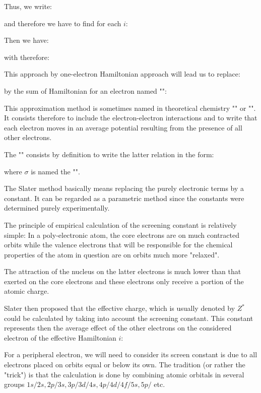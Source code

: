	Thus, we write:
	
	and therefore we have to find for each $i$:
	
	Then we have:
	
	with therefore:
	
	This approach by one-electron Hamiltonian approach will lead us to replace:
	
	by the sum of Hamiltonian for an electron named "":
	
	This approximation method is sometimes named in theoretical chemistry "" or "". It consists therefore to include the electron-electron interactions and to write that each electron moves in an average potential resulting from the presence of all other electrons.
	
	The "" consists by definition to write the latter relation in the form:
	
	where $\sigma$ is named the "".
	
	The Slater method basically means replacing the purely electronic terms by a constant. It can be regarded as a parametric method since the constants were determined purely experimentally.
	
	The principle of empirical calculation of the screening constant is relatively simple: In a poly-electronic atom, the core electrons are on much contracted orbits  while the valence electrons that will be responsible for the chemical properties of the atom in question are on orbits much more "relaxed".
	
	The attraction of the nucleus on the latter electrons is much lower than that exerted on the core electrons and these electrons only receive a portion of the atomic charge.
	
	Slater then proposed that the effective charge, which is usually denoted by $Z^*$ could be calculated by taking into account the screening constant. This constant represents then the average effect of the other electrons on the considered electron  of the effective Hamiltonian $i$:
	
	For a peripheral electron, we will need to consider its screen constant is due to all electrons placed on orbits equal or below its own. The tradition (or rather the "trick") is that the calculation is done by combining atomic orbitals in several groups $1s/2s, 2p/3s, 3p/3d/4s, 4p/4d/4f/5s, 5p/$ etc.
	
